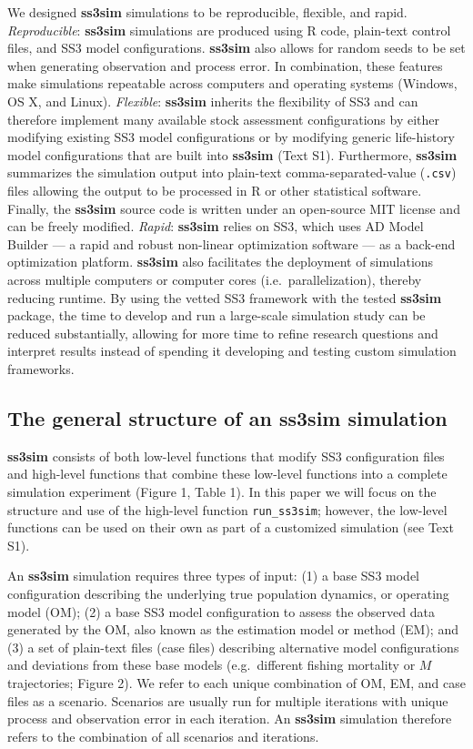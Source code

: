 \documentclass[11pt]{article}
\begin{document}
\begin{spacing}{1.2}
We designed \textbf{ss3sim} simulations to be reproducible,
flexible, and rapid. \emph{Reproducible}: \textbf{ss3sim} simulations are
produced using \textsf{R} code, plain-text control files, and SS3 model
configurations. \textbf{ss3sim} also allows for random seeds to be set when
generating observation and process error. In combination, these features make
simulations repeatable across computers and operating systems (Windows, OS X,
and Linux). \emph{Flexible}: \textbf{ss3sim} inherits the flexibility of SS3
and can therefore implement many available stock assessment configurations by
either modifying existing SS3 model configurations or by modifying generic
life-history model configurations that are built into \textbf{ss3sim} (Text
S1). Furthermore, \textbf{ss3sim} summarizes the simulation output into
plain-text comma-separated-value (\texttt{.csv}) files allowing the output to
be processed in \textsf{R} or other statistical software. Finally, the
\textbf{ss3sim} source code is written under an open-source MIT license and can
be freely modified. \emph{Rapid}: \textbf{ss3sim} relies on SS3, which uses AD
Model Builder \cite{fournier2012} --- a rapid and robust
non-linear optimization software \cite{bolker2013} --- as a back-end
optimization platform. \textbf{ss3sim} also facilitates the deployment of
simulations across multiple computers or computer cores (i.e.~parallelization),
thereby reducing runtime. By using the vetted SS3 framework with the
tested \textbf{ss3sim} package, the time to develop and run a large-scale
simulation study can be reduced substantially, allowing for more time to
refine research questions and interpret results instead of spending it
developing and testing custom simulation frameworks.

\subsection*{The general structure of an ss3sim simulation}

\textbf{ss3sim} consists of both low-level functions that modify SS3
configuration files and high-level functions that combine these low-level
functions into a complete simulation experiment (Figure 1, Table 1). In this
paper we will focus on the structure and use of the high-level function
\texttt{run\_ss3sim}; however, the low-level functions can be used on their own
as part of a customized simulation (see Text S1).

An \textbf{ss3sim} simulation requires three types of input: (1) a base SS3
model configuration describing the underlying true population dynamics, or
operating model (OM); (2) a base SS3 model configuration to assess the observed
data generated by the OM, also known as the estimation model or method (EM);
and (3) a set of plain-text files (case files) describing alternative model
configurations and deviations from these base models (e.g.~different fishing
mortality or $M$ trajectories; Figure 2). We refer to each unique
combination of OM, EM, and case files as a scenario. Scenarios are usually run
for multiple iterations with unique process and observation error in each
iteration. An \textbf{ss3sim} simulation therefore refers to the combination of
all scenarios and iterations.


\end{spacing}
\end{document}

